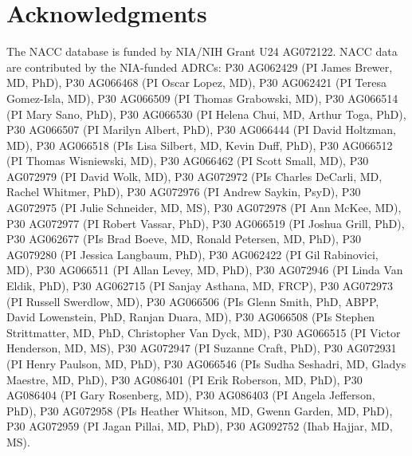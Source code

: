 \documentclass[11pt,a4paper]{article}
\begin{document}
\section*{Acknowledgments}
The NACC database is funded by NIA/NIH Grant U24 AG072122. NACC data are
contributed by the NIA-funded ADRCs: P30 AG062429 (PI James Brewer, MD, PhD),
P30 AG066468 (PI Oscar Lopez, MD), P30 AG062421 (PI Teresa Gomez-Isla, MD),
P30 AG066509 (PI Thomas Grabowski, MD), P30 AG066514 (PI Mary Sano, PhD),
P30 AG066530 (PI Helena Chui, MD, Arthur Toga, PhD), P30 AG066507 (PI Marilyn
Albert, PhD), P30 AG066444 (PI David Holtzman, MD), P30 AG066518 (PIs Lisa
Silbert, MD, Kevin Duff, PhD), P30 AG066512 (PI Thomas Wisniewski, MD),
P30 AG066462 (PI Scott Small, MD), P30 AG072979 (PI David Wolk, MD),
P30 AG072972 (PIs Charles DeCarli, MD, Rachel Whitmer, PhD), P30 AG072976
(PI Andrew Saykin, PsyD), P30 AG072975 (PI Julie Schneider, MD, MS),
P30 AG072978 (PI Ann McKee, MD), P30 AG072977 (PI Robert Vassar, PhD),
P30 AG066519 (PI Joshua Grill, PhD), P30 AG062677 (PIs Brad Boeve, MD, Ronald
Petersen, MD, PhD), P30 AG079280 (PI Jessica Langbaum, PhD), P30 AG062422
(PI Gil Rabinovici, MD), P30 AG066511 (PI Allan Levey, MD, PhD), P30 AG072946
(PI Linda Van Eldik, PhD), P30 AG062715 (PI Sanjay Asthana, MD, FRCP),
P30 AG072973 (PI Russell Swerdlow, MD), P30 AG066506 (PIs Glenn Smith, PhD,
ABPP, David Lowenstein, PhD, Ranjan Duara, MD), P30 AG066508 (PIs Stephen
Strittmatter, MD, PhD, Christopher Van Dyck, MD), P30 AG066515 (PI Victor
Henderson, MD, MS), P30 AG072947 (PI Suzanne Craft, PhD), P30 AG072931
(PI Henry Paulson, MD, PhD), P30 AG066546 (PIs Sudha Seshadri, MD, Gladys
Maestre, MD, PhD), P30 AG086401 (PI Erik Roberson, MD, PhD), P30 AG086404
(PI Gary Rosenberg, MD), P30 AG086403 (PI Angela Jefferson, PhD), P30 AG072958
(PIs Heather Whitson, MD, Gwenn Garden, MD, PhD), P30 AG072959 (PI Jagan
Pillai, MD, PhD), P30 AG092752 (Ihab Hajjar, MD, MS).

\medskip
\end{document}
